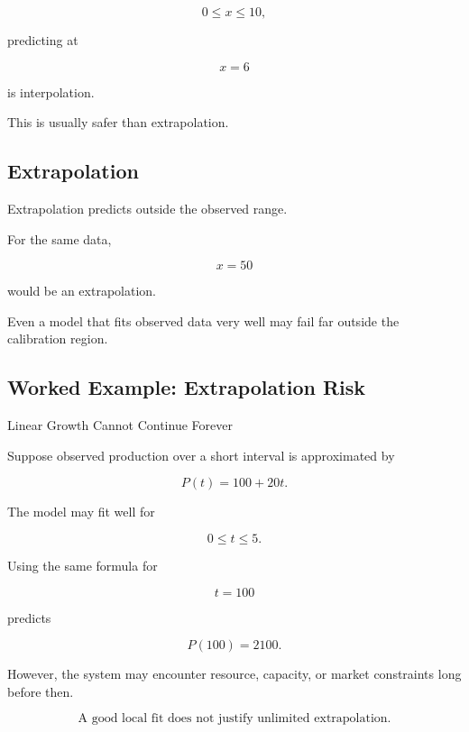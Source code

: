 \[
0\leq x\leq10,
\]

predicting at

\[
x=6
\]

is interpolation.

This is usually safer than extrapolation.

\subsection{Extrapolation}
\label{subsec:model-extrapolation}

Extrapolation predicts outside the observed range.

For the same data,

\[
x=50
\]

would be an extrapolation.

Even a model that fits observed data very well may fail far outside the
calibration region.

\subsection{Worked Example: Extrapolation Risk}
\label{subsec:worked-extrapolation-risk}

\begin{workedexamplebox}{Linear Growth Cannot Continue Forever}

Suppose observed production over a short interval is approximated by

\[
P(t)=100+20t.
\]

The model may fit well for

\[
0\leq t\leq5.
\]

Using the same formula for

\[
t=100
\]

predicts

\[
P(100)=2100.
\]

However, the system may encounter resource, capacity, or market constraints
long before then.

\begin{answerbox}
\[
\boxed{
\text{A good local fit does not justify unlimited extrapolation.}
}
\]
\end{answerbox}

\end{workedexamplebox}

